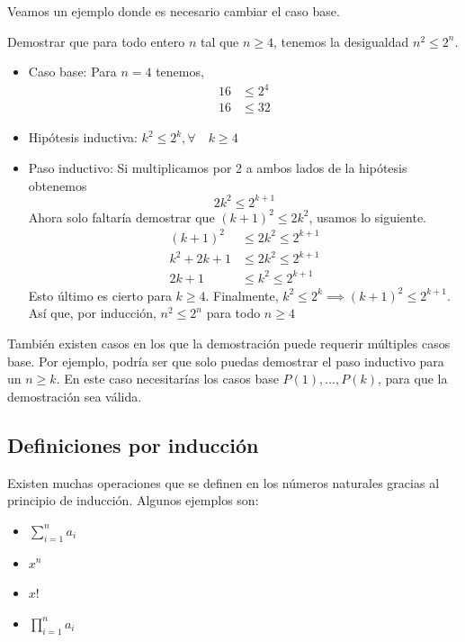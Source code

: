 \documentclass[12pt]{book}
\begin{document}
Veamos un ejemplo donde es necesario cambiar el caso base.\\

\begin{exampleenv}
    Demostrar que para todo entero $n$ tal que $n\ge 4$, tenemos la desigualdad $n^2\leq 2^n$.
    \begin{itemize}
    \item Caso base: Para $n=4$ tenemos,
        \begin{align*}
            16&\leq 2^4\\
            16&\leq 32
        \end{align*}
    \item Hipótesis inductiva: $k^2\leq 2^k,\forall\quad k\ge 4$
    \item Paso inductivo:
        Si multiplicamos por 2 a ambos lados de la hipótesis obtenemos
        \[
            2k^2\leq 2^{k+1}
        \]
        Ahora solo faltaría demostrar que $(k+1)^2\leq 2k^2$, usamos lo siguiente.
        \begin{align*}
            (k+1)^2&\leq 2k^2\leq 2^{k+1}\\
            k^2+2k+1&\leq 2k^2\leq 2^{k+1}\\
            2k+1&\leq k^2\leq 2^{k+1}
        \end{align*}
        Esto último es cierto para $k\ge 4$. Finalmente, $k^2\leq 2^k\implies (k+1)^2\leq 2^{k+1}$. Así que, por inducción, $n^2\leq 2^n$ para todo $n\ge 4$
\end{itemize}
    
\end{exampleenv}

\begin{obsenv}
    También existen casos en los que la demostración puede requerir múltiples casos base. Por ejemplo, podría ser que solo puedas demostrar el paso inductivo para un $n\ge k$. En este caso necesitarías los casos base $P(1),\dots,P(k)$, para que la demostración sea válida.
\end{obsenv}

\subsection{Definiciones por inducción}
\noindent
Existen muchas operaciones que se definen en los números naturales gracias al principio de inducción. Algunos ejemplos son:

\begin{itemize}
    \item $\sum_{i=1}^na_i$
    \item $x^n$
    \item $x!$
    \item $\prod_{i=1}^na_i$
\end{itemize}
\end{document}
